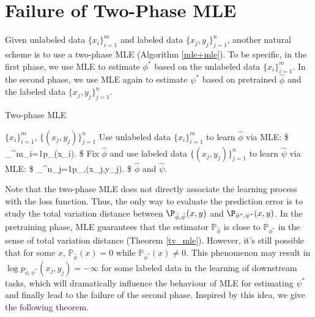 \section{Failure of Two-Phase MLE}\label{counter_example}
Given unlabeled data $\{x_i\}^m_{i=1}$ and labeled data $\{x_j,y_j\}^n_{j=1}$, another natural scheme is to use a two-phase MLE (Algorithm \ref{mle+mle}). To be specific, in the first phase, we use MLE to estimate $\phi^* $ based on the unlabeled data $\{x_i\}^m_{i=1}$. In the second phase, we use MLE again to estimate $\psi^* $ based on pretrained $\hat\phi$ and the labeled data $\{x_j,y_j\}^{n}_{j=1}$.


\begin{algorithm}[H]
\caption{Two-phase MLE}\label{mle+mle}
\begin{algorithmic}[1]
 $\{x_i\}^m_{i=1}$, $\{(x_j,y_j)\}^n_{j=1}$
\State Use unlabeled data $\{x_i\}^m_{i=1}$ to learn $\hat\phi$ via MLE:
\$
\hat\phi\leftarrow\argmax_{\phi\in\Phi}\sum^m_{i=1}\log p_{\phi}(x_i).
\$
\State Fix $\hat\phi$ and use labeled data $\{(x_j,y_j)\}^n_{j=1}$ to learn $\hat\psi$ via MLE:
\$
\hat\psi\leftarrow\argmax_{\psi\in\Psi}\sum^n_{j=1}\log p_{\hat\phi,\psi}(x_j,y_j).
\$
 $\hat\phi$ and $\hat\psi$.
\end{algorithmic}
\end{algorithm}


Note that the two-phase MLE does not directly associate the learning process with the loss function. Thus, the only way to evaluate the prediction error is to study the total variation distance between $\P_{\hat\phi, \hat\psi}(x,y)$ and $\P_{\phi^* ,\psi^* }(x,y)$. In the pretraining phase, MLE guarantees that the estimator $\mathbb{P}_{\hat{\phi}}$ is close to $\mathbb{P}_{\phi^{*}}$ in the sense of total variation distance (Theorem \ref{tv_mle}). However, it's still possible that for some $x$, $\mathbb{P}_{\hat{\phi}}(x)=0$ while $\mathbb{P}_{\phi^{*}}(x) \neq 0$. This phenomenon may result in $\log p_{\hat\phi,\psi^* }(x_j,y_j)=-\infty$ for some labeled data in the learning of downstream tasks, which will dramatically influence the behaviour of MLE for estimating $\psi^{*}$ and finally lead to the failure of the second phase. Inspired by this idea, we give the following theorem.



